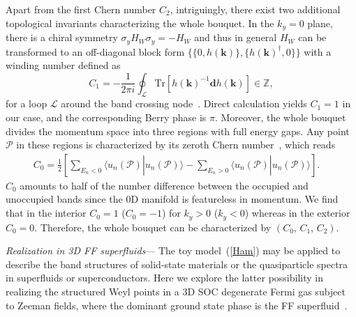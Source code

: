 \documentclass[prl,aps,twocolumn,showpacs,floatfix]{revtex4}
\begin{document}
Apart from the first Chern number $C_2$, intriguingly, there exist two
additional topological invariants characterizing the whole bouquet. In the $%
k_y=0$ plane, there is a chiral symmetry $\sigma_y H_W\sigma_y=-H_W$ and
thus in general $H_W$ can be transformed to an off-diagonal block form $%
\{\{0,h(\mathbf{k})\},\{h(\mathbf{k})^\dagger,0\}\}$ with a winding number
defined as
\begin{equation}
C_1=-\frac{1}{2\pi i}\oint_\mathcal{L}\text{Tr}[h(\mathbf{k})^{-1}\mathbf{d}%
h(\mathbf{k})]\in\mathbb{Z},  \label{EqWN}
\end{equation}
for a loop $\mathcal{L}$ around the band crossing node~\cite%
{Jeffrey,Fan2014PRB,Prodan2014PRB}. Direct calculation yields $C_1=1$ in our
case, and the corresponding Berry phase is $\pi$. Moreover, the whole
bouquet divides the momentum space into three regions with full energy gaps.
Any point $\mathcal{P}$ in these regions is characterized by its zeroth
Chern number~\cite{Jeffrey}, which reads
\begin{eqnarray}
C_0=\frac{1}{2}\left[\sum_{E_{n}<0} \langle u_{n}(\mathcal{P})|u_{n}(%
\mathcal{P})\rangle- \sum_{E_{n}>0} \langle u_{n}(\mathcal{P})|u_{n}(%
\mathcal{P})\rangle\right]. \quad
\end{eqnarray}
$C_0$ amounts to half of the number difference between the occupied and
unoccupied bands since the 0D manifold is featureless in momentum. We find
that in the interior $C_0=1$ ($C_0=-1$) for $k_y>0$ ($k_y<0$) whereas in the
exterior $C_0=0$. Therefore, the whole bouquet can be characterized by $%
(C_0,\,C_1,\,C_2)$.

\emph{Realization in 3D FF superfluids}--- The toy model~(\ref{Ham}) may be
applied to describe the band structures of solid-state materials or the
quasiparticle spectra in superfluids or superconductors. Here we explore the
latter possibility in realizing the structured Weyl points in a 3D SOC
degenerate Fermi gas subject to Zeeman fields, where the dominant ground
state phase is the FF superfluid~\cite%
{Zheng2013PRA,FanWu2013PRL,Liu2013PRA,Lin2013NJP,YongReveiw}.
\end{document}
